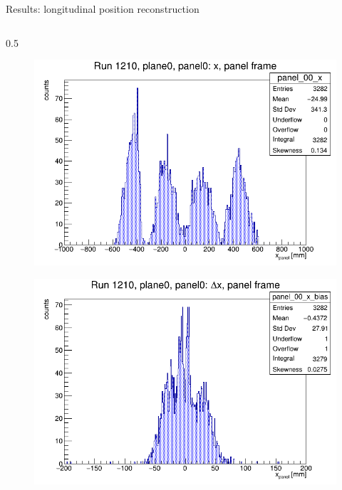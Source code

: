 \documentclass{beamer}[10pt]
\begin{document}
\begin{frame}{Results: longitudinal position reconstruction}
  \vspace{-3mm}
  \begin{columns}
    \begin{column}{0.5\framewidth}
      \begin{figure}[H]
        \centering
        \includegraphics[width= \textwidth]{figures/pdf/x_panel0.png}
        \label{fig:enter-label}
    \end{figure}
    \vspace{-12mm}
    \begin{figure}[H]
      \centering
      \includegraphics[width=  \textwidth]{figures/pdf/panel_00_x_bias.png}
      \label{fig:enter-label}
  \end{figure}
     

\end{column}
\end{columns}
\end{frame}
\end{document}
